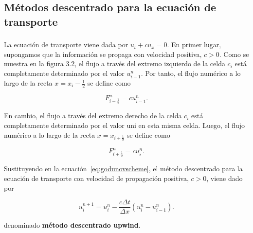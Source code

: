 \subsection{Métodos descentrado para la ecuación de transporte}

\begin{frame}
    \frametitle{\subsecname}

    La ecuación de transporte viene dada por $u_{t}+cu_{x}=0$.
    En primer lugar, supongamos que la información se propaga con
    velocidad positiva, $c>0$.
    Como se muestra en la figura 3.2, el flujo a través del extremo
    izquierdo de la celda $c_{i}$ está completamente determinado por el
    valor $u^{n}_{i-1}$.
    Por tanto, el flujo numérico a lo largo de la recta
    $x=x_{i}-\frac{1}{2}$ se define como

    \begin{equation*}
        F^{n}_{i-\frac{1}{2}}=
        cu^{n}_{i-1}.
    \end{equation*}

    En cambio, el flujo a través del extremo derecho de la celda $c_{i}$
    está completamente determinado por el valor uni en esta misma celda.
    Luego, el flujo numérico a lo largo de la recta $x=x_{i+\frac{1}{2}}$
    se define como

    \begin{equation*}
        F^{n}_{i+\frac{1}{2}}=
        cu^{n}_{i}.
    \end{equation*}

    Sustituyendo en la ecuación~\eqref{eq:godunovscheme}, el método
    descentrado para la ecuación de transporte con velocidad de
    propagación positiva, $c>0$, viene dado por

    \begin{equation}\label{eq:upwind}
        u^{n+1}_{i}=
        u^{n}_{i}-
        \frac{c\Delta t}{\Delta x}
        \left(
        u^{n}_{i}-
        u^{n}_{i-1}
        \right).
    \end{equation}

    denominado \textbf{método descentrado upwind}.
\end{frame}

